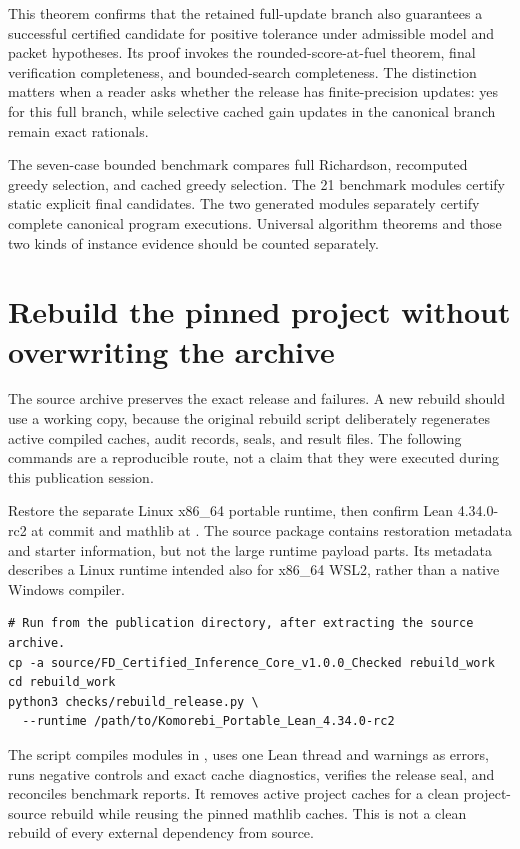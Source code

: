 \documentclass[11pt]{article}\usepackage{needspace}\renewcommand{\paperkind}{Lean companion}\setlength{\parskip}{0.35em}
\begin{document}
This theorem confirms that the retained full-update branch also guarantees a successful certified candidate for positive tolerance under admissible model and packet hypotheses. Its proof invokes the rounded-score-at-fuel theorem, final verification completeness, and bounded-search completeness. The distinction matters when a reader asks whether the release has finite-precision updates: yes for this full branch, while selective cached gain updates in the canonical branch remain exact rationals.

The seven-case bounded benchmark compares full Richardson, recomputed greedy selection, and cached greedy selection. The 21 benchmark modules certify static explicit final candidates. The two generated modules separately certify complete canonical program executions. Universal algorithm theorems and those two kinds of instance evidence should be counted separately.

\section{Rebuild the pinned project without overwriting the archive}

The source archive preserves the exact release and failures. A new rebuild should use a working copy, because the original rebuild script deliberately regenerates active compiled caches, audit records, seals, and result files. The following commands are a reproducible route, not a claim that they were executed during this publication session.

Restore the separate Linux x86\_64 portable runtime, then confirm Lean 4.34.0-rc2 at commit  and mathlib at . The source package contains restoration metadata and starter information, but not the large runtime payload parts. Its metadata describes a Linux runtime intended also for x86\_64 WSL2, rather than a native Windows compiler.
\begin{lstlisting}[language={},basicstyle=\ttfamily\small,breaklines=true,frame=single]
# Run from the publication directory, after extracting the source archive.
cp -a source/FD_Certified_Inference_Core_v1.0.0_Checked rebuild_work
cd rebuild_work
python3 checks/rebuild_release.py \
  --runtime /path/to/Komorebi_Portable_Lean_4.34.0-rc2
\end{lstlisting}

The script compiles modules in , uses one Lean thread and warnings as errors, runs negative controls and exact cache diagnostics, verifies the release seal, and reconciles benchmark reports. It removes active project caches for a clean project-source rebuild while reusing the pinned mathlib caches. This is not a clean rebuild of every external dependency from source.
\end{document}
